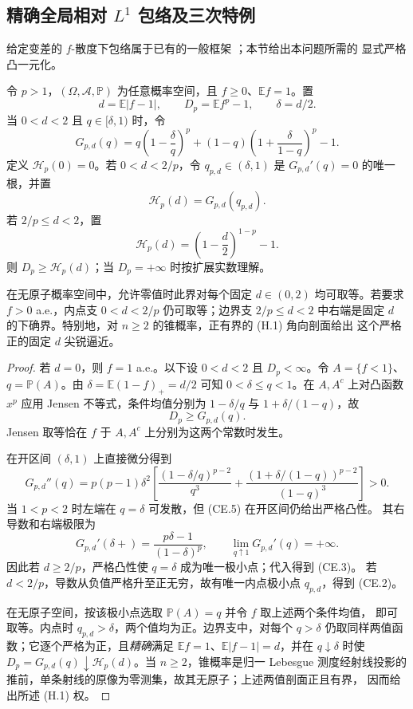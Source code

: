 \subsection{精确全局相对 \texorpdfstring{$L^1$}{L1} 包络及三次特例}
\label{subsec:global-l1-cubic}

给定变差的 $f$-散度下包络属于已有的一般框架
\cite{Gilardoni2006MinimumF,Gilardoni2010Corrigendum}；本节给出本问题所需的
显式严格凸一元化。

\begin{theorem}
\label{thm:fixed-l1-lp-envelope}
令 $p>1$，$(\Omega,\mathcal A,\mathbb P)$ 为任意概率空间，且
$f\ge0$、$\mathbb Ef=1$。置
\[
 d=\mathbb E|f-1|,\qquad D_p=\mathbb Ef^p-1,\qquad \delta=d/2.
\]
当 $0<d<2$ 且 $q\in[\delta,1)$ 时，令
\[
 G_{p,d}(q)=q\left(1-\frac\delta q\right)^p+
 (1-q)\left(1+\frac\delta{1-q}\right)^p-1. \tag{CE.1}
\]
定义 $\mathcal H_p(0)=0$。若 $0<d<2/p$，令 $q_{p,d}\in(\delta,1)$ 是
$G_{p,d}'(q)=0$ 的唯一根，并置
\[
 \mathcal H_p(d)=G_{p,d}(q_{p,d}). \tag{CE.2}
\]
若 $2/p\le d<2$，置
\[
 \mathcal H_p(d)=\left(1-\frac d2\right)^{1-p}-1. \tag{CE.3}
\]
则 $D_p\ge\mathcal H_p(d)$；当 $D_p=+\infty$ 时按扩展实数理解。

在无原子概率空间中，允许零值时此界对每个固定 $d\in(0,2)$ 均可取等。若要求
$f>0$ a.e.，内点支 $0<d<2/p$ 仍可取等；边界支 $2/p\le d<2$ 中右端是固定
$d$ 的下确界。特别地，对 $n\ge2$ 的锥概率，正有界的 \textup{(H.1)} 角向剖面给出
这个严格正的固定 $d$ 尖锐逼近。
\end{theorem}

\begin{proof}
若 $d=0$，则 $f=1$ a.e.。以下设 $0<d<2$ 且 $D_p<\infty$。令
$A=\{f<1\}$、$q=\mathbb P(A)$。由
\(\delta=\mathbb E(1-f)_+=d/2\) 可知 $0<\delta\le q<1$。在
$A,A^c$ 上对凸函数 $x^p$ 应用 Jensen 不等式，条件均值分别为
$1-\delta/q$ 与 $1+\delta/(1-q)$，故
\[
 D_p\ge G_{p,d}(q). \tag{CE.4}
\]
Jensen 取等恰在 $f$ 于 $A,A^c$ 上分别为这两个常数时发生。

在开区间 $(\delta,1)$ 上直接微分得到
\[
 G_{p,d}''(q)=p(p-1)\delta^2\left[
 \frac{(1-\delta/q)^{p-2}}{q^3}+
 \frac{(1+\delta/(1-q))^{p-2}}{(1-q)^3}\right]>0. \tag{CE.5}
\]
当 $1<p<2$ 时左端在 $q=\delta$ 可发散，但 (CE.5) 在开区间仍给出严格凸性。
其右导数和右端极限为
\[
 G_{p,d}'(\delta+)=\frac{p\delta-1}{(1-\delta)^p},\qquad
 \lim_{q\uparrow1}G_{p,d}'(q)=+\infty. \tag{CE.6}
\]
因此若 $d\ge2/p$，严格凸性使 $q=\delta$ 成为唯一极小点；代入得到 (CE.3)。
若 $d<2/p$，导数从负值严格升至正无穷，故有唯一内点极小点 $q_{p,d}$，得到
(CE.2)。

在无原子空间，按该极小点选取 $\mathbb P(A)=q$ 并令 $f$ 取上述两个条件均值，
即可取等。内点时 $q_{p,d}>\delta$，两个值均为正。边界支中，对每个
$q>\delta$ 仍取同样两值函数；它逐个严格为正，且\emph{精确}满足
$\mathbb Ef=1$、$\mathbb E|f-1|=d$，并在 $q\downarrow\delta$ 时使
$D_p=G_{p,d}(q)\downarrow\mathcal H_p(d)$。当 $n\ge2$，锥概率是归一 Lebesgue
测度经射线投影的推前，单条射线的原像为零测集，故其无原子；上述两值剖面正且有界，
因而给出所述 \textup{(H.1)} 权。
\end{proof}

